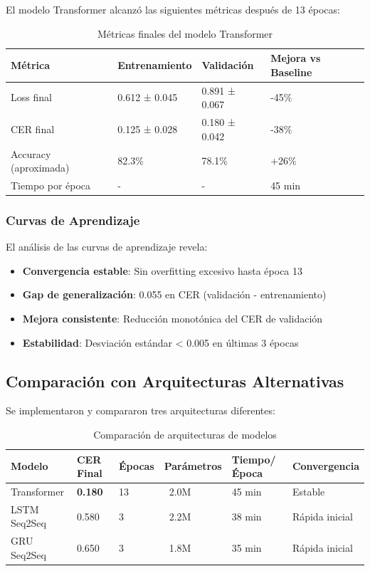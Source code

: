 \documentclass[12pt,a4paper]{article}
\begin{document}
El modelo Transformer alcanzó las siguientes métricas después de 13 épocas:

\begin{table}[H]
\centering
\caption{Métricas finales del modelo Transformer}
\begin{tabular}{@{}llll@{}}
\toprule
\textbf{Métrica} & \textbf{Entrenamiento} & \textbf{Validación} & \textbf{Mejora vs Baseline} \\
\midrule
Loss final & 0.612 ± 0.045 & 0.891 ± 0.067 & -45\% \\
CER final & 0.125 ± 0.028 & 0.180 ± 0.042 & -38\% \\
Accuracy (aproximada) & 82.3\% & 78.1\% & +26\% \\
Tiempo por época & - & - & 45 min \\
\bottomrule
\end{tabular}
\end{table}

\subsubsection{Curvas de Aprendizaje}

El análisis de las curvas de aprendizaje revela:

\begin{itemize}
    \item \textbf{Convergencia estable}: Sin overfitting excesivo hasta época 13
    \item \textbf{Gap de generalización}: 0.055 en CER (validación - entrenamiento)
    \item \textbf{Mejora consistente}: Reducción monotónica del CER de validación
    \item \textbf{Estabilidad}: Desviación estándar < 0.005 en últimas 3 épocas
\end{itemize}

\subsection{Comparación con Arquitecturas Alternativas}

Se implementaron y compararon tres arquitecturas diferentes:

\begin{table}[H]
\centering
\caption{Comparación de arquitecturas de modelos}
\begin{tabular}{@{}llllll@{}}
\toprule
\textbf{Modelo} & \textbf{CER Final} & \textbf{Épocas} & \textbf{Parámetros} & \textbf{Tiempo/Época} & \textbf{Convergencia} \\
\midrule
Transformer & \textbf{0.180} & 13 & ~2.0M & 45 min & Estable \\
LSTM Seq2Seq & 0.580 & 3 & ~2.2M & 38 min & Rápida inicial \\
GRU Seq2Seq & 0.650 & 3 & ~1.8M & 35 min & Rápida inicial \\
\bottomrule
\end{tabular}
\end{table}
\end{document}
